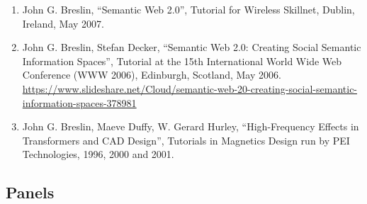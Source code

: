 \documentclass[10pt,a4paper]{res} %
\begin{document}
\begin{resume}
\begin{enumerate}
\item John G. Breslin, ``Semantic Web 2.0'', Tutorial for Wireless Skillnet, Dublin, Ireland, May 2007. %
\item John G. Breslin, Stefan Decker, ``Semantic Web 2.0: Creating Social Semantic Information Spaces'', Tutorial at the 15th International World Wide Web Conference (WWW 2006), Edinburgh, Scotland, May 2006. \url{https://www.slideshare.net/Cloud/semantic-web-20-creating-social-semantic-information-spaces-378981}
\item John G. Breslin, Maeve Duffy, W. Gerard Hurley, ``High-Frequency Effects in Transformers and CAD Design'', Tutorials in Magnetics Design run by PEI Technologies, 1996, 2000 and 2001. %
\end{enumerate}

\subsection*{Panels}


\end{resume}
\end{document}
